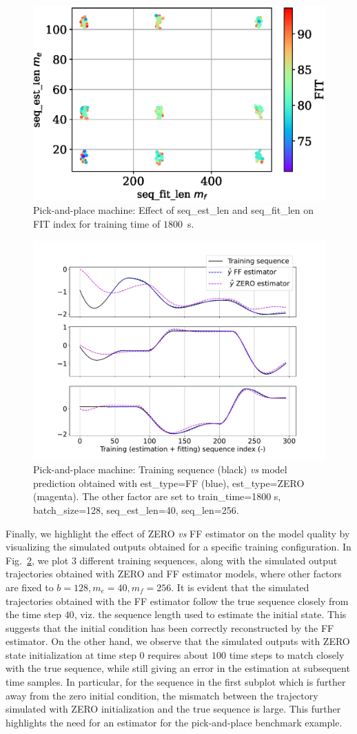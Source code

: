 \documentclass{article}
\newcommand{\batchsize}{b}
\newcommand{\seqlen}{m}
\begin{document}
\begin{figure}
	\centering
	\includegraphics[width=.5\columnwidth]{figures/PP_max_time_est_vs_fit.eps}
	\caption{Pick-and-place machine: Effect of seq\_est\_len and seq\_fit\_len on FIT index for training time of $1800$~s.}
	\label{fig:pp_grid}
\end{figure}


\begin{figure}
	\centering
	\includegraphics[width=.7\columnwidth]{figures/pp_subseq_best_worst.pdf}
	\caption{Pick-and-place machine: Training sequence (black) \emph{vs} model prediction obtained with est\_type=FF (blue), est\_type=ZERO (magenta). 
		The other factor are set to train\_time=1800 s, batch\_size=128, seq\_est\_len=40, seq\_len=256.}
	\label{fig:pp_subset_best_worst}
\end{figure}

Finally, we highlight the effect of ZERO \emph{vs} FF estimator on the model quality by visualizing the simulated outputs obtained for a specific training configuration.  In Fig.~\ref{fig:pp_subset_best_worst}, we plot $3$ different training sequences, along with the simulated output trajectories obtained with ZERO and FF estimator models, where other factors are fixed to $\batchsize = 128, \seqlen_e = 40, \seqlen_f = 256$. It is evident that the simulated trajectories obtained with the FF estimator follow the true sequence closely from the time step $40$, viz. the sequence length used to estimate the initial state. This suggests that the initial condition has been correctly reconstructed by the {FF} estimator. On the other hand, we observe that the simulated outputs with ZERO state initialization at time step $0$ requires about $100$ time steps to match closely with the true sequence, while still giving an error in the estimation at subsequent time samples. 
In particular, for the sequence in the first subplot which is further away from the zero initial condition, the mismatch between the trajectory simulated with ZERO initialization and the true sequence is large. This further highlights the need for an estimator for the pick-and-place benchmark example.  
\end{document}
